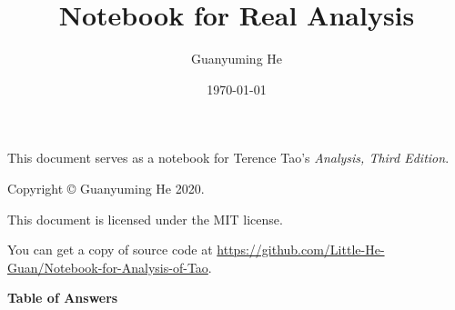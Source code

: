 \documentclass[11pt]{article}
\author{Guanyuming He}
\title{Notebook for Real Analysis}
\date{\today}
\begin{document}
\maketitle

\begin{center}
This document serves as a notebook for Terence Tao's \emph{Analysis, Third Edition}.
\end{center}

\vspace{\fill}

\begin{center}
Copyright \copyright{} Guanyuming He 2020. 

This document is licensed under the MIT license.

You can get a copy of source code at 
\url{https://github.com/Little-He-Guan/Notebook-for-Analysis-of-Tao}.
\end{center}

\newpage
{}
\tableofcontents

\newpage


\newpage
{}
\pagestyle{headings}



\newpage


\newpage


\newpage


\newpage
\pagestyle{myheadings}

\begin{center}
\begin{Large}
\textbf{Table of Answers}
\end{Large}
\end{center}
\end{document}
